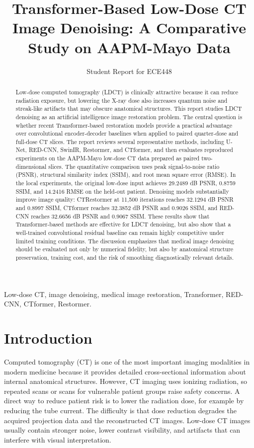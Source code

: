 \documentclass[journal]{IEEEtran}
\title{Transformer-Based Low-Dose CT Image Denoising: A Comparative Study on AAPM-Mayo Data}
\author{Student Report for ECE448}
\begin{document}
\maketitle

\begin{abstract}
Low-dose computed tomography (LDCT) is clinically attractive because it can reduce radiation exposure, but lowering the X-ray dose also increases quantum noise and streak-like artifacts that may obscure anatomical structures. This report studies LDCT denoising as an artificial intelligence image restoration problem. The central question is whether recent Transformer-based restoration models provide a practical advantage over convolutional encoder-decoder baselines when applied to paired quarter-dose and full-dose CT slices. The report reviews several representative methods, including U-Net, RED-CNN, SwinIR, Restormer, and CTformer, and then evaluates reproduced experiments on the AAPM-Mayo low-dose CT data prepared as paired two-dimensional slices. The quantitative comparison uses peak signal-to-noise ratio (PSNR), structural similarity index (SSIM), and root mean square error (RMSE). In the local experiments, the original low-dose input achieves 29.2489 dB PSNR, 0.8759 SSIM, and 14.2416 RMSE on the held-out patient. Denoising models substantially improve image quality: CTRestormer at 11,500 iterations reaches 32.1294 dB PSNR and 0.8997 SSIM, CTformer reaches 32.3852 dB PSNR and 0.9026 SSIM, and RED-CNN reaches 32.6656 dB PSNR and 0.9067 SSIM. These results show that Transformer-based methods are effective for LDCT denoising, but also show that a well-trained convolutional residual baseline can remain highly competitive under limited training conditions. The discussion emphasizes that medical image denoising should be evaluated not only by numerical fidelity, but also by anatomical structure preservation, training cost, and the risk of smoothing diagnostically relevant details.
\end{abstract}

\begin{IEEEkeywords}
Low-dose CT, image denoising, medical image restoration, Transformer, RED-CNN, CTformer, Restormer.
\end{IEEEkeywords}

\section{Introduction}
Computed tomography (CT) is one of the most important imaging modalities in modern medicine because it provides detailed cross-sectional information about internal anatomical structures. However, CT imaging uses ionizing radiation, so repeated scans or scans for vulnerable patient groups raise safety concerns. A direct way to reduce patient risk is to lower the radiation dose, for example by reducing the tube current. The difficulty is that dose reduction degrades the acquired projection data and the reconstructed CT images. Low-dose CT images usually contain stronger noise, lower contrast visibility, and artifacts that can interfere with visual interpretation.
\end{document}
